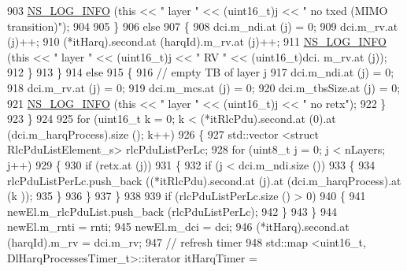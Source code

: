 \begin{DoxyCode}
903                       \hyperlink{group__logging_gafbd73ee2cf9f26b319f49086d8e860fb}{NS\_LOG\_INFO} (\textcolor{keyword}{this} << \textcolor{stringliteral}{" layer "} << (uint16\_t)j << \textcolor{stringliteral}{" no txed (MIMO
       transition)"});
904 
905                     \}
906                   \textcolor{keywordflow}{else}
907                     \{
908                       dci.m\_ndi.at (j) = 0;
909                       dci.m\_rv.at (j)++;
910                       (*itHarq).second.at (harqId).m\_rv.at (j)++;
911                       \hyperlink{group__logging_gafbd73ee2cf9f26b319f49086d8e860fb}{NS\_LOG\_INFO} (\textcolor{keyword}{this} << \textcolor{stringliteral}{" layer "} << (uint16\_t)j << \textcolor{stringliteral}{" RV "} << (uint16\_t)dci.
      m\_rv.at (j));
912                     \}
913                 \}
914               \textcolor{keywordflow}{else}
915                 \{
916                   \textcolor{comment}{// empty TB of layer j}
917                   dci.m\_ndi.at (j) = 0;
918                   dci.m\_rv.at (j) = 0;
919                   dci.m\_mcs.at (j) = 0;
920                   dci.m\_tbsSize.at (j) = 0;
921                   \hyperlink{group__logging_gafbd73ee2cf9f26b319f49086d8e860fb}{NS\_LOG\_INFO} (\textcolor{keyword}{this} << \textcolor{stringliteral}{" layer "} << (uint16\_t)j << \textcolor{stringliteral}{" no retx"});
922                 \}
923             \}
924 
925           \textcolor{keywordflow}{for} (uint16\_t k = 0; k < (*itRlcPdu).second.at (0).at (dci.m\_harqProcess).size (); k++)
926             \{
927               std::vector <struct RlcPduListElement\_s> rlcPduListPerLc;
928               \textcolor{keywordflow}{for} (uint8\_t j = 0; j < nLayers; j++)
929                 \{
930                   \textcolor{keywordflow}{if} (retx.at (j))
931                     \{
932                       \textcolor{keywordflow}{if} (j < dci.m\_ndi.size ())
933                         \{
934                           rlcPduListPerLc.push\_back ((*itRlcPdu).second.at (j).at (dci.m\_harqProcess).at (k
      ));
935                         \}
936                     \}
937                 \}
938 
939               \textcolor{keywordflow}{if} (rlcPduListPerLc.size () > 0)
940                 \{
941                   newEl.m\_rlcPduList.push\_back (rlcPduListPerLc);
942                 \}
943             \}
944           newEl.m\_rnti = rnti;
945           newEl.m\_dci = dci;
946           (*itHarq).second.at (harqId).m\_rv = dci.m\_rv;
947           \textcolor{comment}{// refresh timer}
948           std::map <uint16\_t, DlHarqProcessesTimer\_t>::iterator itHarqTimer = 

\end{DoxyCode}
